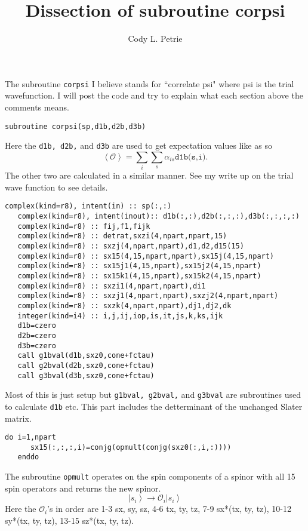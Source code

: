 \documentclass[12pt]{extarticle}
\title{Dissection of subroutine corpsi}
\author{Cody L. Petrie}
\newcommand{\Oi}{\mathcal{O}_{i}}
\newcommand{\ket}[1]{\left| #1 \right>}
\newcommand{\bverb}{\begin{Verbatim}[frame=single]}
\begin{document}
\maketitle

The subroutine \texttt{corpsi} I believe stands for ``correlate psi" where psi is the trial wavefunction. I will post the code and try to explain what each section above the comments means.

\bverb
   subroutine corpsi(sp,d1b,d2b,d3b)
\end{Verbatim}
Here the \texttt{d1b, d2b,} and \texttt{d3b} are used to get expectation values like as so
\begin{equation}
  \left< \mathcal{O} \right> = \sum_i\sum_s \alpha_{is}\texttt{d1b(s,i)}.
\end{equation}
The other two are calculated in a similar manner. See my write up on the trial wave function to see details.

\bverb
   complex(kind=r8), intent(in) :: sp(:,:)
   complex(kind=r8), intent(inout):: d1b(:,:),d2b(:,:,:),d3b(:,:,:,:)
   complex(kind=r8) :: fij,f1,fijk
   complex(kind=r8) :: detrat,sxzi(4,npart,npart,15)
   complex(kind=r8) :: sxzj(4,npart,npart),d1,d2,d15(15)
   complex(kind=r8) :: sx15(4,15,npart,npart),sx15j(4,15,npart)
   complex(kind=r8) :: sx15j1(4,15,npart),sx15j2(4,15,npart)
   complex(kind=r8) :: sx15k1(4,15,npart),sx15k2(4,15,npart)
   complex(kind=r8) :: sxzi1(4,npart,npart),di1
   complex(kind=r8) :: sxzj1(4,npart,npart),sxzj2(4,npart,npart)
   complex(kind=r8) :: sxzk(4,npart,npart),dj1,dj2,dk
   integer(kind=i4) :: i,j,ij,iop,is,it,js,k,ks,ijk
   d1b=czero
   d2b=czero
   d3b=czero
   call g1bval(d1b,sxz0,cone+fctau)
   call g2bval(d2b,sxz0,cone+fctau)
   call g3bval(d3b,sxz0,cone+fctau)
\end{Verbatim}
Most of this is just setup but \texttt{g1bval, g2bval,} and \texttt{g3bval} are subroutines used to calculate \texttt{d1b} etc. This part includes the detterminant of the unchanged Slater matrix.

\bverb
   do i=1,npart
      sx15(:,:,:,i)=conjg(opmult(conjg(sxz0(:,i,:))))
   enddo
\end{Verbatim}
The subroutine \texttt{opmult} operates on the spin components of a spinor with all 15 spin operators and returns the new spinor.
\begin{equation}
  \ket{s_i} \rightarrow \Oi\ket{s_i}
\end{equation}
Here the $\Oi$'s in order are 1-3 sx, sy, sz, 4-6 tx, ty, tz, 7-9 sx*(tx, ty, tz), 10-12 sy*(tx, ty, tz), 13-15 sz*(tx, ty, tz).
\end{document}
